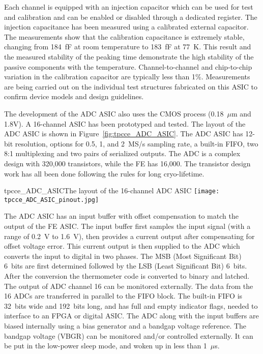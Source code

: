 Each channel is equipped with an injection capacitor which can be used
for test and calibration and can be enabled or disabled through a
dedicated register. The injection capacitance has been measured using 
a calibrated external capacitor. The measurements show
that the calibration capacitance is extremely stable, changing from
184~fF at room temperature to 183~fF at 77~K. This result and the measured
stability of the peaking time demonstrate the high stability of the
passive components with the temperature. Channel-to-channel and chip-to-chip
variation in the calibration capacitor are typically less than 1\%. Measurements are being carried
out on the individual test structures fabricated on this ASIC to
confirm device models and design guidelines.

The development of the ADC ASIC also uses the CMOS process (0.18~$\mu$m and 1.8V).
A 16-channel ASIC has been prototyped and tested.
The layout of the ADC ASIC is shown in Figure~\ref{fig:tpcce_ADC_ASIC}. 
The ADC ASIC has 12-bit resolution, options for 0.5, 1, and 2~MS/s sampling rate, a built-in FIFO, 
two 8:1 multiplexing and two pairs of serialized outputs.
The ADC is a complex design with 320,000 transistors, while the FE has 16,000.
The transistor design work has all been done following the rules for long cryo-lifetime.

\begin{cdrfigure}{tpcce_ADC_ASIC}{The layout of the 16-channel ADC ASIC}
\texttt{[image: tpcce\_ADC\_ASIC\_pinout.jpg]} %
\end{cdrfigure}

The ADC ASIC has an input buffer with offset compensation to match the output of the FE ASIC.
The input buffer first samples the input signal (with a range of 0.2~V to 1.6~V),
then provides a current output after compensating for offset voltage error.
This current output is then supplied to the ADC which converts the input to digital in two phases.
The MSB (Most Significant Bit) 6~bits are first determined followed by the LSB (Least Significant Bit) 6~bits.
After the conversion the thermometer code is converted to binary and latched.
The output of ADC channel 16 can be monitored externally.
The data from the 16 ADCs are transferred in parallel to the FIFO block.
The built-in FIFO is 32~bits wide and 192~bits long,
and has full and empty indicator flags, needed to interface to an FPGA or digital ASIC.
The ADC along with the input buffers are biased internally using a bias generator and a bandgap voltage reference.
The bandgap voltage (VBGR) can be monitored and/or controlled externally.
It can be put in the low-power sleep mode, and woken up in less than 1~$\mu$s.

